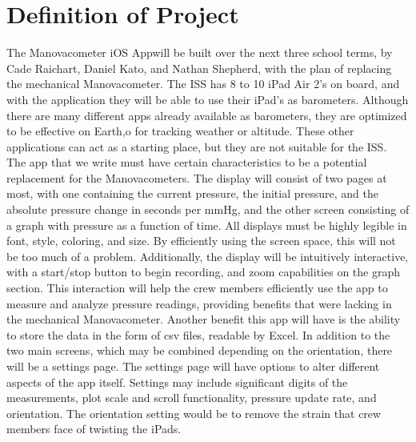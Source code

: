 \documentclass[onecolumn, draftclsnofoot,10pt, compsoc]{IEEEtran}
\def \GroupMemberOne{			Cade Raichart}
\def \GroupMemberTwo{			Daniel Kato}
\def \GroupMemberThree{			Nathan Shepherd}
\def \CapstoneProjectName{		Manovacometer iOS App}
\begin{document}
\section{Definition of Project}
The \CapstoneProjectName will be built over the next three school terms, by \GroupMemberOne, \GroupMemberTwo, and \GroupMemberThree, with the plan of replacing the mechanical Manovacometer.
The ISS has 8 to 10 iPad Air 2's on board, and with the application they will be able to use their iPad's as barometers.
Although there are many different apps already available as barometers, they are optimized to be effective on Earth,o for tracking weather or altitude.
These other applications can act as a starting place, but they are not suitable for the ISS.
The app that we write must have certain characteristics to be a potential replacement for the Manovacometers.
The display will consist of two pages at most, with one containing the current pressure, the initial pressure, and the absolute pressure change in seconds per mmHg, and the other screen consisting of a graph with pressure as a function of time.
All displays must be highly legible in font, style, coloring, and size.
By efficiently using the screen space, this will not be too much of a problem.
Additionally, the display will be intuitively interactive, with a start/stop button to begin recording, and zoom capabilities on the graph section.
This interaction will help the crew members efficiently use the app to measure and analyze pressure readings, providing benefits that were lacking in the mechanical Manovacometer.
Another benefit this app will have is the ability to store the data in the form of csv files, readable by Excel.
In addition to the two main screens, which may be combined depending on the orientation, there will be a settings page.
The settings page will have options to alter different aspects of the app itself.
Settings may include significant digits of the measurements, plot scale and scroll functionality, pressure update rate, and orientation.
The orientation setting would be to remove the strain that crew members face of twisting the iPads. 
\end{document}
